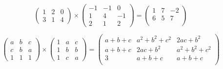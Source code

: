 {{$$\left( \begin{array}
 {ccc} 1 & 2 & 0  \\ 3 & 1 & 4 \end{array} \right) 
\times
\left( \begin{array}{ccc} -1 &-1& 0 \\ 1 & 4 & -1 \\ 2 & 1 & 2\end{array} \right)
= \begin{pmatrix}
  1 & 7 & -2 \\
  6 & 5 & 7 \\ 
  \end{pmatrix}$$

$$\left( \begin{array}{ccc} a &b& c \\ c & b & a \\ 1 & 1 & 1\end{array} \right)
\times
 \left( \begin{array}{ccc} 1 &a& c \\ 1 & b & b \\ 1 & c & a\end{array} \right) 
 = \begin{pmatrix}
    a + b + c & a^2+b^2+c^2 & 2ac + b^2 \\
    a + b + c & 2ac + b^2   & a^2+b^2+c^2 \\
    3         &  a+b+c      & a+b+c \\
\end{pmatrix}$$
}
}
